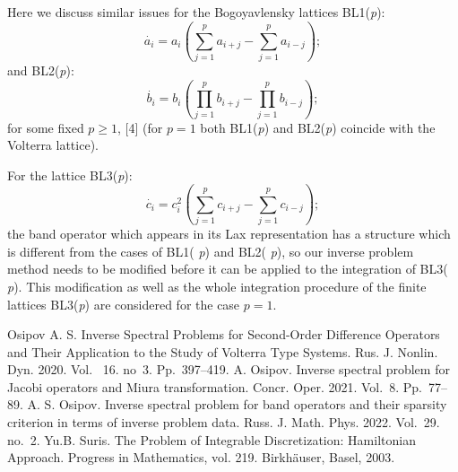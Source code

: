 \documentclass[12pt]{llncs}
\begin{document}
Here we discuss similar issues for the Bogoyavlensky lattices
BL1({\it p}):
\begin{equation*}
\overset \cdot
a_i=a_i\left(\sum_{j=1}^{p}a_{i+j}-\sum_{j=1}^{p}a_{i-j}\right );
\end{equation*}
and BL2({\it p}):
\begin{equation*}
\overset \cdot
b_i=b_i\left(\prod_{j=1}^{p}b_{i+j}-\prod_{j=1}^{p}b_{i-j}\right
);
\end{equation*}
for some fixed $p\ge 1$, [4] (for $p=1$ both BL1({\it p}) and BL2({\it p}) coincide with the Volterra lattice).

For the lattice BL3({\it p}):
\begin{equation*}
\overset \cdot
c_i=c_i^2\left(\sum_{j=1}^{p}c_{i+j}-\sum_{j=1}^{p}c_{i-j}\right
);
\end{equation*}
the band operator which appears in its Lax representation has a structure which is different from the cases of BL1({\it
p}) and  BL2({\it
p}), so our inverse problem method needs to be
modified before it can be applied to the integration of BL3({\it
p}). This modification as well as the whole integration procedure
of the finite lattices BL3({\it p}) are considered for the case
$p=1$.

\begin{thebibliography}{9} %
  Osipov A. S. Inverse Spectral Problems for
Second-Order Difference Operators and Their Application to the
Study of Volterra Type Systems. Rus. J. Nonlin. Dyn. 2020. Vol.~
16. no~3. Pp.~397--419.
 A. Osipov. Inverse spectral problem for Jacobi operators
and Miura transformation. Concr. Oper. 2021. Vol.~8. Pp.~77--89.
  A. S. Osipov. Inverse spectral problem for band
operators and their sparsity criterion in terms of inverse problem
data. Russ. J. Math. Phys. 2022. Vol.~29. no.~2.
Yu.B. Suris. The Problem of Integrable Discretization:
Hamiltonian Approach. Progress in Mathematics, vol. 219.
Birkh\"auser, Basel, 2003.

\end{thebibliography}

\end{document}
